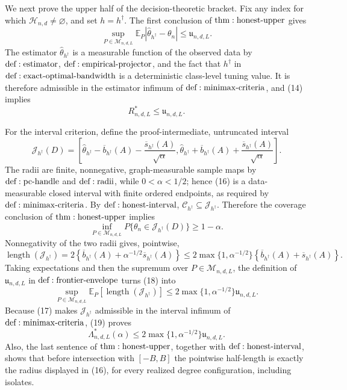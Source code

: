 We next prove the upper half of the decision-theoretic bracket.  Fix any index for which \(\mathcal H_{n,d}\ne\varnothing\), and set \(h=h^\dagger\).  The first conclusion of \({\rm thm:honest\text{-}upper}\) gives
\[
 \sup_{P\in\mathcal M_{n,d,L}}
 \mathbb E_P|\widehat\theta_{h^\dagger}-\theta_n|
 \leq \mathfrak u_{n,d,L}.
\tag{14}
\]
The estimator \(\widehat\theta_{h^\dagger}\) is a measurable function of the observed data by \({\rm def:estimator}\), \({\rm def:empirical\text{-}projector}\), and the fact that \(h^\dagger\) in \({\rm def:exact\text{-}optimal\text{-}bandwidth}\) is a deterministic class-level tuning value.  It is therefore admissible in the estimator infimum of \({\rm def:minimax\text{-}criteria}\), and (14) implies
\[
 R^*_{n,d,L}\leq\mathfrak u_{n,d,L}.
\tag{15}
\]

For the interval criterion, define the proof-intermediate, untruncated interval
\[
 \mathcal J_{h^\dagger}(D)=
 \left[
 \widehat\theta_{h^\dagger}-\overline b_{h^\dagger}(A)
 -\frac{\overline s_{h^\dagger}(A)}{\sqrt\alpha},
 \widehat\theta_{h^\dagger}+\overline b_{h^\dagger}(A)
 +\frac{\overline s_{h^\dagger}(A)}{\sqrt\alpha}
 \right].
\tag{16}
\]
The radii are finite, nonnegative, graph-measurable sample maps by \({\rm def:pc\text{-}handle}\) and \({\rm def:radii}\), while \(0<\alpha<1/2\); hence (16) is a data-measurable closed interval with finite ordered endpoints, as required by \({\rm def:minimax\text{-}criteria}\).  By \({\rm def:honest\text{-}interval}\), \(\mathcal C_{h^\dagger}\subseteq\mathcal J_{h^\dagger}\).  Therefore the coverage conclusion of \({\rm thm:honest\text{-}upper}\) implies
\[
 \inf_{P\in\mathcal M_{n,d,L}}
 P\{\theta_n\in\mathcal J_{h^\dagger}(D)\}
 \geq1-\alpha.
\tag{17}
\]
Nonnegativity of the two radii gives, pointwise,
\[
 \operatorname{length}(\mathcal J_{h^\dagger})
 =2\left\{\overline b_{h^\dagger}(A)
 +\alpha^{-1/2}\overline s_{h^\dagger}(A)\right\}
 \leq2\max\{1,\alpha^{-1/2}\}
 \left\{\overline b_{h^\dagger}(A)+\overline s_{h^\dagger}(A)\right\}.
\tag{18}
\]
Taking expectations and then the supremum over \(P\in\mathcal M_{n,d,L}\), the definition of \(\mathfrak u_{n,d,L}\) in \({\rm def:frontier\text{-}envelope}\) turns (18) into
\[
 \sup_{P\in\mathcal M_{n,d,L}}
 \mathbb E_P\!\left[\operatorname{length}(\mathcal J_{h^\dagger})\right]
 \leq2\max\{1,\alpha^{-1/2}\}\mathfrak u_{n,d,L}.
\tag{19}
\]
Because (17) makes \(\mathcal J_{h^\dagger}\) admissible in the interval infimum of \({\rm def:minimax\text{-}criteria}\), (19) proves
\[
 \Lambda^*_{n,d,L}(\alpha)
 \leq2\max\{1,\alpha^{-1/2}\}\mathfrak u_{n,d,L}.
\tag{20}
\]
Also, the last sentence of \({\rm thm:honest\text{-}upper}\), together with \({\rm def:honest\text{-}interval}\), shows that before intersection with \([-B,B]\) the pointwise half-length is exactly the radius displayed in (16), for every realized degree configuration, including isolates.

